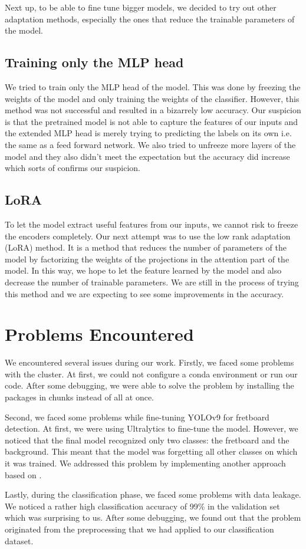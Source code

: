 \documentclass[10pt,twocolumn,letterpaper]{article}
\begin{document}
Next up, to be able to fine tune bigger models, we decided to try out other adaptation methods, especially the ones that reduce the trainable parameters of the model.

\subsection{Training only the MLP head}
We tried to train only the MLP head of the model. This was done by freezing the weights of the model and only training the weights of the classifier. However, this method was not successful and resulted in a bizarrely low accuracy. Our suspicion is that the pretrained model is not able to capture the features of our inputs and the extended MLP head is merely trying to predicting the labels on its own i.e. the same as a feed forward network.
We also tried to unfreeze more layers of the model and they also didn't meet the expectation but the accuracy did increase which sorts of confirms our suspicion.
\subsection{LoRA}
To let the model extract useful features from our inputs, we cannot risk to freeze the encoders completely. Our next attempt was to use the low rank adaptation (LoRA) method. It is a method that reduces the number of parameters of the model by factorizing the weights of the projections in the attention part of the model. In this way, we hope to let the feature learned by the model and also decrease the number of trainable parameters. We are still in the process of trying this method and we are expecting to see some improvements in the accuracy.

\section{Problems Encountered}
We encountered several issues during our work. Firstly, we faced some problems with the cluster. At first, we could not configure a conda environment or run our code. After some debugging, we were able to solve the problem by installing the packages in chunks instead of all at once.

Second, we faced some problems while fine-tuning YOLOv9 for fretboard detection. At first, we were using Ultralytics to fine-tune the model. However, we noticed that the final model recognized only two classes: the fretboard and the background. This meant that the model was forgetting all other classes on which it was trained. We addressed this problem by implementing another approach based on \cite{}.

Lastly, during the classification phase, we faced some problems with data leakage. We noticed a rather high classification accuracy of 99\% in the validation set which was surprising to us. After some debugging, we found out that the problem originated from the preprocessing that we had applied to our classification dataset.


{\small


}
\end{document}
